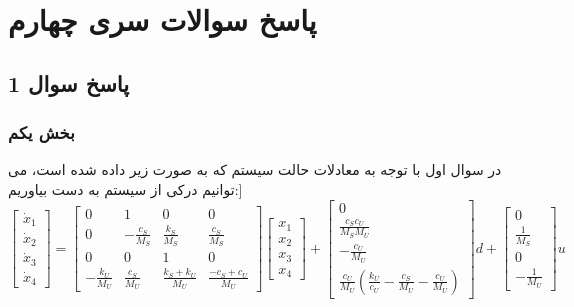 
\chapter*{پاسخ سوالات سری چهارم}

\section*{ پاسخ سوال 1}
\subsection*{بخش یکم}

در سوال اول با توجه به معادلات حالت سیستم که به صورت زیر داده شده است، می توانیم درکی از سیستم به دست بیاوریم:]
\[
\begin{bmatrix}
	\dot{x}_1 \\ \dot{x}_2 \\ \dot{x}_3 \\ \dot{x}_4
\end{bmatrix}
=
\begin{bmatrix}
	0 & 1 & 0 & 0 \\
	0 & -\frac{c_S}{M_S} & \frac{k_S}{M_S} & \frac{c_S}{M_S} \\
	0 & 0 & 1 & 0 \\
	-\frac{k_U}{M_U} & \frac{c_S}{M_U} & \frac{k_S + k_U}{M_U} & \frac{-c_S + c_U}{M_U}
\end{bmatrix}
\begin{bmatrix}
	x_1 \\ x_2 \\ x_3 \\ x_4
\end{bmatrix}
+
\begin{bmatrix}
	0 \\ \frac{c_S c_U}{M_S M_U} \\ -\frac{c_U}{M_U} \\ \frac{c_U}{M_U}\left(\frac{k_U}{c_U} - \frac{c_S}{M_U} - \frac{c_U}{M_U}\right)
\end{bmatrix}
d
+
\begin{bmatrix}
	0 \\ \frac{1}{M_S} \\ 0 \\ -\frac{1}{M_U}
\end{bmatrix}
u
\]

